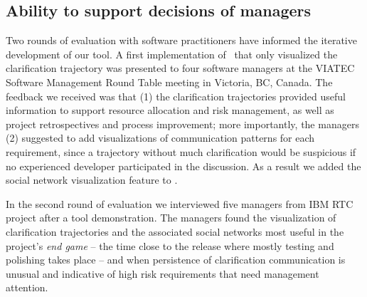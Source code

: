 \subsection{Ability to support decisions of managers}
Two rounds of evaluation with software practitioners have informed the iterative development of our tool. A first implementation of \viss\ that only visualized the clarification trajectory was presented to four software managers at the VIATEC Software Management Round Table meeting in Victoria, BC, Canada. The feedback we received was that (1) the clarification trajectories provided useful information to support resource allocation and risk management, as well as project retrospectives and process improvement; more importantly, the managers (2) suggested to add visualizations of communication patterns for each requirement, since a trajectory without much clarification would be suspicious if no experienced developer participated in the discussion. As a result we added the social network visualization feature to \viss. 


In the second round of evaluation we interviewed five managers from IBM RTC project after a tool demonstration. The managers found the visualization of clarification trajectories and the associated social networks most useful in the project's \emph{end game} -- the time close to the release where mostly testing and polishing takes place -- and when persistence of  clarification communication is unusual and indicative of high risk requirements that need management attention.

